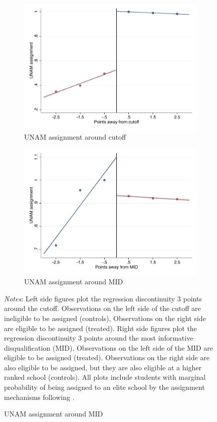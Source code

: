 \documentclass[oneside,11pt]{article}
\begin{document}
\begin{figure}[H]
\begin{center}
    \begin{subfigure}{0.475\textwidth}
        \caption{UNAM assignment around cutoff}
        \centering
        \includegraphics[width=\textwidth]{04_Figures/rd_plot_tau_UNAM_assig_UNAM3.pdf}
    \end{subfigure}
    \begin{subfigure}{0.475\textwidth}
        \caption{UNAM assignment around MID}
        \centering
        \includegraphics[width=\textwidth]{04_Figures/rd_plot_mid_UNAM_assig_UNAM3.pdf}
    \end{subfigure}
    \end{center}
    
\footnotesize
\textit{Notes}: Left side figures plot the regression discontinuity 3 points around the cutoff. Observations on the left side of the cutoff are ineligible to be assigned (controls), Observations on the right side are eligible to be assigned (treated). Right side figures plot the regression discontinuity 3 points around the most informative disqualification (MID). Observations on the left side of the MID are eligible to be assigned (treated). Observations on the right side are also eligible to be assigned, but they are also eligible at a higher ranked school (controls). All plots include students with marginal probability of being assigned to an elite school by the assignment mechanisms following \citet{abdulkadirouglu2022breaking}. 
\end{figure}
\end{document}
